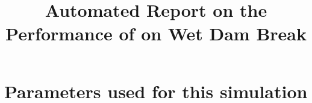 \documentclass[11pt,a4paper]{article}
\begin{document}
 

\title{Automated Report on the Performance of \anuga{} on Wet Dam Break}
\maketitle





\section{Parameters used for this simulation}






\end{document}
